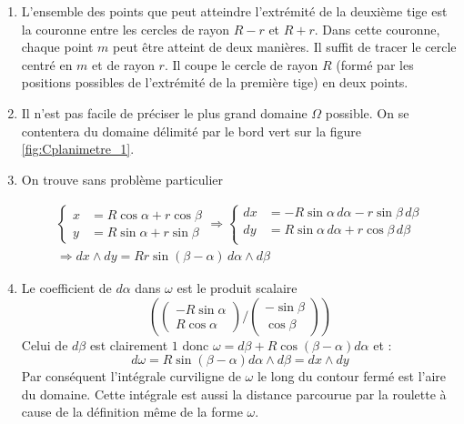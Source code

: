 \begin{enumerate}
 \item L'ensemble des points que peut atteindre l'extrémité de la deuxième tige est la couronne entre les cercles de rayon $R-r$ et $R+r$. Dans cette couronne, chaque point $m$ peut être atteint de deux manières. Il suffit de tracer le cercle centré en $m$ et de rayon $r$. Il coupe le cercle de rayon $R$ (formé par les positions possibles de l'extrémité de la première tige) en deux points.
\item Il n'est pas facile de préciser le plus grand domaine $\Omega$ possible. On se contentera du domaine délimité par le bord vert sur la figure \ref{fig:Cplanimetre_1}.
\item On trouve sans problème particulier

\begin{multline*}
\left\lbrace 
\begin{aligned}
x &= R\cos \alpha +r \cos \beta \\
y &= R\sin \alpha +r \sin \beta  
\end{aligned} 
\right. 
\Rightarrow
\left\lbrace 
\begin{aligned}
dx &= -R\sin \alpha \,d\alpha -r \sin \beta \,d\beta\\
dy &= R\sin \alpha \,d\alpha + r \cos \beta \,d\beta\\ 
\end{aligned}
\right. \\
  \Rightarrow dx\wedge dy = Rr\sin(\beta-\alpha)\, d\alpha \wedge d\beta 
\end{multline*}

\item 
Le coefficient de $d\alpha$ dans $\omega$ est le produit scalaire
\begin{displaymath}
(\begin{pmatrix}
-R\sin \alpha\\
R\cos \alpha
  \end{pmatrix}
/
\begin{pmatrix}
-\sin \beta\\
\cos \beta
  \end{pmatrix} )
\end{displaymath}
Celui de $d\beta$ est clairement $1$ donc $\omega=d\beta +R\cos(\beta-\alpha)d\alpha$ et :
\[d\omega= R\sin(\beta-\alpha)d\alpha \wedge d\beta=dx\wedge dy\]
Par conséquent l'intégrale curviligne de $\omega$ le long du contour fermé est l'aire du domaine. Cette intégrale est aussi la distance parcourue par la roulette à cause de la définition même de la forme $\omega$.
\end{enumerate}
